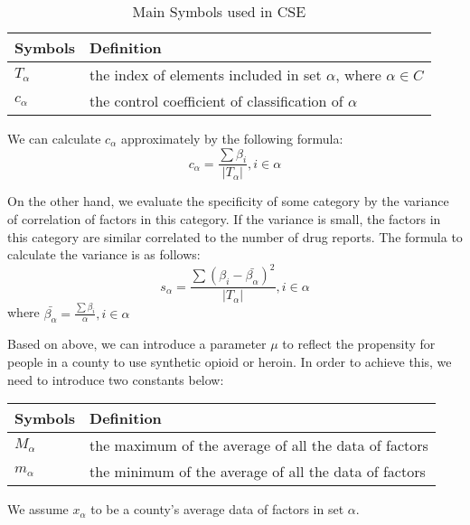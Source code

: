 \documentclass{mcmthesis}
\begin{document}
\begin{table}[!h]
\centering
\caption{Main Symbols used in CSE} %
\begin{tabular}{ll}
\toprule[2.5pt]
\textbf{Symbols}& \textbf{Definition} \\
\midrule[1.5pt]
 $T_{\alpha}$ & the index of elements included in set $\alpha$, where $\alpha \in C$\\
 \midrule
 $c_{\alpha}$ & the control coefficient of classification of $\alpha$ \\

\bottomrule
\end{tabular}
\end{table}
We can calculate $c_{\alpha}$ approximately by the following formula:
\begin{equation}  c_{\alpha} = \frac{\sum \beta_i}{|T_{\alpha}|}, i \in \alpha \end{equation}

On the other hand, we evaluate the specificity of some category by the variance of correlation of factors in this category. If the variance is small, the factors in this category are similar correlated to the number of drug reports. The formula to calculate the variance is as follows:
\begin{equation}   s_{\alpha} = \frac{\sum (\beta_i - \bar{\beta_{\alpha}})^2}{|T_{\alpha}|}, i \in \alpha  \end{equation}
where $\bar{\beta_{\alpha}} = \frac{\sum \beta_i}{\alpha}, i \in \alpha$

Based on above, we can introduce a parameter $\mu$ to reflect the propensity for people in a county to use synthetic opioid or heroin. In order to achieve this, we need to introduce two constants below:

\begin{table}[!h]
\centering

\begin{tabular}{ll}
\toprule[2.5pt]
\textbf{Symbols}& \textbf{Definition} \\
\midrule[1.5pt]
 $M_{\alpha}$ & the maximum of the average of all the data of factors \\
 \midrule
 $m_{\alpha}$ & the minimum of the average of all the data of factors \\

\bottomrule
\end{tabular}
\end{table}
We assume $x_{\alpha}$ to be a county's average data of factors in set $\alpha$.
\end{document}

